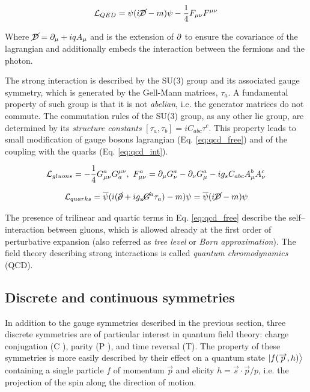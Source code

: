 \begin{equation}
\mathcal{L}_{QED} = \psi(i\cancel{\mathcal{D}} - m)\psi - \dfrac{1}{4} F_{\mu\nu} F^{\mu\nu}
\end{equation}

Where $\cancel{\mathcal{D}} = \partial_\mu + i q A_\mu$ and is the extension of $\partial$ to ensure the covariance of the lagrangian and additionally embeds the interaction between the fermions and the photon.

The strong interaction is described by the SU(3) group and its associated gauge symmetry, which is generated by the Gell-Mann matrices, $\tau_a$. A fundamental property of such group is that it is not \emph{abelian}, i.e. the generator matrices do not commute. The commutation rules of the SU(3) group, as any other lie group, are determined by its \emph{structure constants} $[\tau_a, \tau_b] = i C_{abc} \tau^c$. This property leads to small modification of gauge bosons lagrangian (Eq. \ref{eq:qcd_free}) and of the coupling with the quarks (Eq. \ref{eq:qcd_int}).

\begin{equation}
\mathcal{L}_{gluons} = - \dfrac{1}{4} G^{a}_{\mu\nu}  G_{a}^{\mu\nu}, \, \, F^{a}_{\mu\nu} = \partial_\mu G^a_\nu - \partial_\nu G^a_\mu -i g_s C_{abc} A^b_\mu A^c_\nu
\label{eq:qcd_free}
\end{equation}

\begin{equation}
\mathcal{L}_{quarks} = \overline{\psi} ( i (\cancel{\partial} + i g_s \cancel{G}^a \tau_a) - m ) \psi = \overline{\psi} ( i \cancel{\mathcal{D}} - m ) \psi
\label{eq:qcd_int}
\end{equation}

The presence of trilinear and quartic terms in Eq. \ref{eq:qcd_free} describe the self--interaction between gluons, which is allowed already at the first order of perturbative expansion (also referred as \emph{tree level} or \emph{Born approximation}). The field theory describing strong interactions is called \emph{quantum chromodynamics} (QCD).

\subsection{Discrete and continuous symmetries}

In addition to the gauge symmetries described in the previous section, three discrete symmetries are of particular interest in quantum field theory: charge conjugation (C ), parity (P ), and time reversal (T). The property of these symmetries is more easily described by their effect on a quantum state $|f(\overrightarrow{p}, h)\big{>}$ containing a single particle $f$ of momentum $\vec{p}$ and elicity $h = \vec{s} \cdot \vec{p} / p$, i.e. the projection of the spin along the direction of motion.

